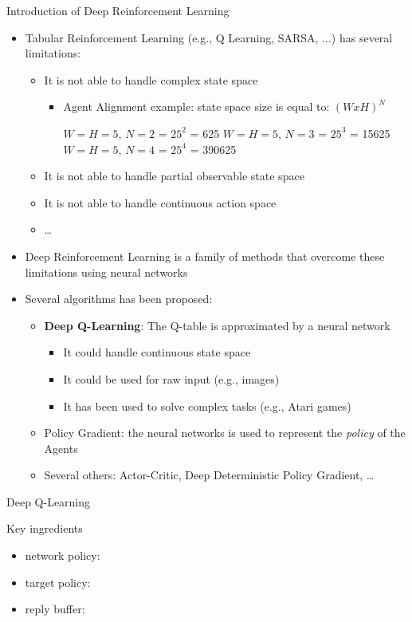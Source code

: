 \documentclass[presentation, 8pt]{beamer}\mode<presentation>{\usetheme{AMSBolognaFC}}
\begin{document}
\begin{frame}{Introduction of Deep Reinforcement Learning}
\begin{itemize}
	\item Tabular Reinforcement Learning (e.g., Q Learning, SARSA, ...) has several limitations:
	\begin{itemize}
		\item It is not able to handle complex state space 
		\begin{itemize}
			\item Agent Alignment example: state space size is equal to: $(WxH)^N$
			\begin{tasks}
				\task $W = H = 5$, $N = 2$ = $25^2$ = 625
				\task $W = H = 5$, $N = 3$ = $25^3$ = 15625
				\task $W = H = 5$, $N = 4$ = $25^4$ = 390625
			\end{tasks}
		\end{itemize}
		\item It is not able to handle partial observable state space
		\item It is not able to handle continuous action space
		\item \dots
	\end{itemize}
	\item Deep Reinforcement Learning is a family of methods that overcome these limitations using neural networks
	\item Several algorithms has been proposed:
	\begin{itemize}
		\item \textbf{Deep Q-Learning}: The Q-table is approximated by a neural network
		\begin{itemize}
			\item It could handle continuous state space
			\item It could be used for raw input (e.g., images)
			\item It has been used to solve complex tasks (e.g., Atari games)
		\end{itemize}
		\item Policy Gradient: the neural networks is used to represent the \emph{policy} of the Agents
		\item Several others: Actor-Critic, Deep Deterministic Policy Gradient, \dots
	\end{itemize}
\end{itemize}
\end{frame}
\begin{frame}{Deep Q-Learning}
	\begin{exampleblock}{Key ingredients}
		\begin{itemize}
			
		\item network policy:
		\item target policy:
		\item reply buffer:
		\end{itemize}
	\end{exampleblock}
\end{frame}
\end{document}
